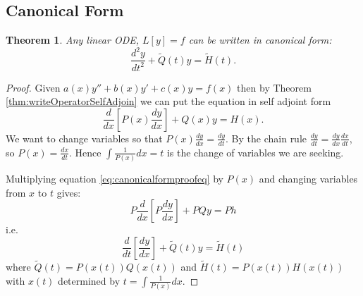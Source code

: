 \documentclass{article}
\theoremstyle{plain}
\newtheorem{thm}{Theorem}[section]
\theoremstyle{definition}
\numberwithin{equation}{section}
\begin{document}
\subsection{Canonical Form}

\begin{thm}
    Any linear ODE, $L[y]=f$ can be written in canonical form:
    \[ \frac{d^2y}{dt^2} + \tilde{Q}(t)y = \tilde{H}(t). \]
\end{thm}

\begin{proof}
    Given $a(x)y'' + b(x)y' + c(x)y = f(x)$ then by Theorem \ref{thm:writeOperatorSelfAdjoin} we can put the equation in self adjoint form
    \begin{equation}\label{eq:canonicalformproofeq}
        \frac{d}{dx}\left[ P(x)\frac{dy}{dx} \right] + Q(x)y = H(x).
    \end{equation}
    We want to change variables so that $P(x)\frac{dy}{dx} = \frac{dy}{dt}$. By the chain rule $\frac{dy}{dt} = \frac{dy}{dx}\frac{dx}{dt}$, so $P(x) = \frac{dx}{dt}$. Hence $\int \frac{1}{P(x)} dx = t$ is the change of variables we are seeking.

    Multiplying equation \eqref{eq:canonicalformproofeq} by $P(x)$ and changing variables from $x$ to $t$ gives:
    \[ P\frac{d}{dx}\left[ P \frac{dy}{dx} \right] + PQy = Ph\]
    i.e. 
    \[\frac{d}{dt}\left[ \frac{dy}{dx} \right] + \tilde{Q}(t)y = \tilde{H}(t) \]
    where $\tilde{Q}(t) = P(x(t))Q(x(t)) $ and $\tilde{H}(t) = P(x(t))H(x(t))$ with $x(t)$ determined by $t=\int \frac{1}{P(x)} dx$.
\end{proof}
\end{document}
